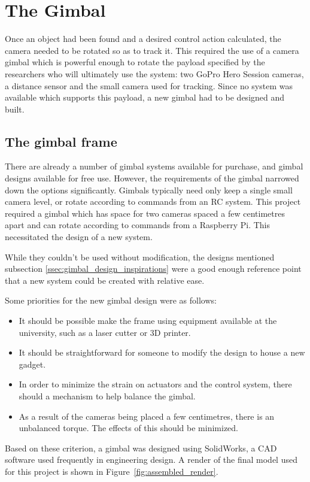 \chapter{The Gimbal}
Once an object had been found and a desired control action calculated, the camera needed to be rotated so as to track it. This required the use of a camera gimbal which is powerful enough to rotate the payload specified by the researchers who will ultimately use the system: two GoPro Hero Session cameras, a distance sensor and the small camera used for tracking. Since no system was available which supports this payload, a new gimbal had to be designed and built.

\section{The gimbal frame}
There are already a number of gimbal systems available for purchase, and gimbal designs available for free use. However, the requirements of the gimbal narrowed down the options significantly. Gimbals typically need only keep a single small camera level, or rotate according to commands from an RC system. This project required a gimbal which has space for two cameras spaced a few centimetres apart and can rotate according to commands from a Raspberry Pi. This necessitated the design of a new system.

While they couldn't be used without modification, the designs mentioned subsection \ref{ssec:gimbal_design_inspirations} were a good enough reference point that a new system could be created with relative ease.

Some priorities for the new gimbal design were as follows:

\begin{itemize}
\item It should be possible make the frame using equipment available at the university, such as a laser cutter or 3D printer.
\item It should be straightforward for someone to modify the design to house a new gadget.
\item In order to minimize the strain on actuators and the control system, there should a mechanism to help balance the gimbal.
\item As a result of the cameras being placed a few centimetres, there is an unbalanced torque. The effects of this should be minimized.
\end{itemize}
%
Based on these criterion, a gimbal was designed using SolidWorks, a CAD software used frequently in engineering design. A render of the final model used for this project is shown in Figure~\ref{fig:assembled_render}.

